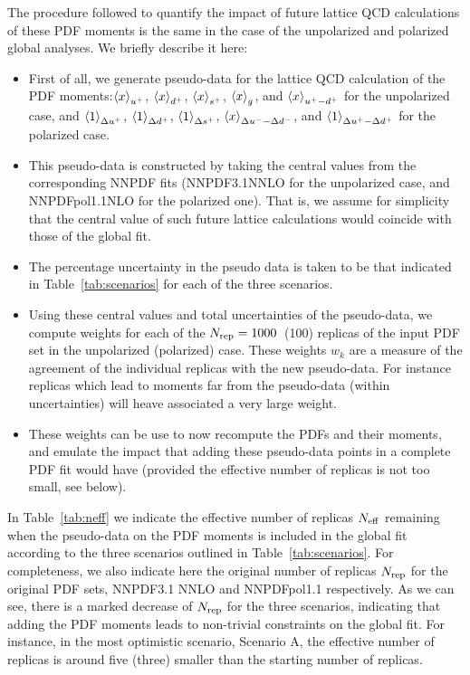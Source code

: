 The procedure followed to quantify the impact of future
lattice QCD calculations of these
PDF moments is the same in the case of the unpolarized
and polarized global analyses.
We briefly describe it here:
\begin{itemize}
\item First of all, we generate pseudo-data for the lattice QCD calculation
  of the PDF moments:$\left\langle x\right\rangle_{u^+}$,
$\left\langle x\right\rangle_{d^+}$,
$\left\langle x\right\rangle_{s^+}$,
$\left\langle x\right\rangle_{g}$, and
  $\left\langle x\right\rangle_{u^+-d^+}$ for the unpolarized case, and
  $\left\langle 1\right\rangle_{\Delta u^+}$,
$\left\langle 1\right\rangle_{\Delta d^+}$,
$\left\langle 1\right\rangle_{\Delta s^+}$,
$\left\langle x\right\rangle_{\Delta u^--\Delta d^-}$, and
  $\left\langle 1\right\rangle_{\Delta u^+ - \Delta d^+}$ for the polarized case.
\item This pseudo-data is constructed by taking the central values from
  the corresponding NNPDF fits (NNPDF3.1NNLO for the unpolarized case, and NNPDFpol1.1NLO
  for the polarized one). That is, we assume for simplicity that the central value
  of such future lattice calculations would coincide with those of the global fit.
\item The percentage uncertainty in the pseudo data is taken to be that indicated in
  Table~\ref{tab:scenarios} for each of the three scenarios.
\item Using these central values and total uncertainties of the pseudo-data, we compute
  weights for each of the $N_{\rm rep}=1000$~(100) replicas of the input PDF set
  in the unpolarized (polarized) case.
  These weights $w_k$ are a measure of the agreement of the individual replicas with the new pseudo-data.
  For instance replicas which lead to moments far from the pseudo-data (within uncertainties) will
  heave associated a very large weight.
\item These weights can be use to now recompute the PDFs and their moments, and emulate the
  impact that adding these pseudo-data points in a complete PDF fit would have (provided
  the effective number of replicas is not too small, see below).
  \end{itemize}

In Table~\ref{tab:neff} we indicate the effective number of replicas
    $N_{\rm eff}$ remaining when the pseudo-data
    on the PDF moments is included in the global
    fit according to the three scenarios outlined
    in Table~\ref{tab:scenarios}.
    For completeness, we also indicate here the original number
    of replicas $N_{\rm rep}$ for the original
    PDF sets, NNPDF3.1 NNLO and NNPDFpol1.1 respectively.
    As we can see, there is a marked decrease of $N_{\rm rep}$
    for the three scenarios, indicating that adding the
    PDF moments leads to non-trivial constraints on the global
    fit.
    For instance, in the most optimistic scenario,
    Scenario A, the effective number of replicas is around five (three)
 smaller than the starting number of replicas.


